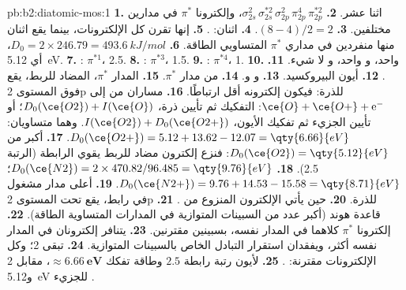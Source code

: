 \begin{solution}{pb:b2:diatomic-mos:1}
\textbf{1.} اثنا عشر.
\textbf{2.} $\sigma_{2s}^2\,\sigma_{2s}^{*2}\,\sigma_{2p}^2\,\pi_{2p}^4\,\pi_{2p}^{*2}$، وإلكترونا $\pi^*$
في مدارين مختلفين.
\textbf{3.} $(8 - 4)/2 = 2$.
\textbf{4.} اثنان:  .
\textbf{5.} إنها تقرن كل الإلكترونات، بينما يقع اثنان منها منفردين في مداري
$\pi^*$ المتساويي الطاقة.
\textbf{6.} $D_0 = 2 \times 246.79 = \qty{493.6}{kJ/mol}$، أي \qty{5.12}{eV}.
\textbf{7.} : $\pi^{*1}$،  2.5.
\textbf{8.} : $\pi^{*3}$،  1.5.
\textbf{9.} : $\pi^{*4}$،  1.
\textbf{10.}  واحد، و واحد، و لا شيء.
\textbf{11.} .
\textbf{12.} أيون البيروكسيد.
\textbf{13.}  و و.
\textbf{14.} من مدار $\pi^*$.
\textbf{15.} المدار $\pi^*$، المضاد للربط، يقع فوق المستوى 2p للذرة: فيكون
إلكترونه أقل ارتباطًا.
\textbf{16.} مساران من  إلى $\ce{O} + \ce{O+} + \mathrm e^-$: التفكيك ثم
تأيين ذرة، $D_0(\ce{O2}) + I(\ce{O})$؛ أو تأيين الجزيء ثم تفكيك الأيون،
$I(\ce{O2}) + D_0(\ce{O2+})$. وهما متساويان: $D_0(\ce{O2+}) = 5.12 + 13.62 - 12.07 = \qty{6.66}{eV}$.
\textbf{17.} أكبر من $D_0(\ce{O2}) = \qty{5.12}{eV}$: فنزع إلكترون مضاد للربط
يقوي الرابطة (الرتبة 2.5).
\textbf{18.} $D_0(\ce{N2}) = 2 \times 470.82/96.485 = \qty{9.76}{eV}$؛ $D_0(\ce{N2+}) = 9.76 +
14.53 - 15.58 = \qty{8.71}{eV}$.
\textbf{19.} أعلى مدار مشغول في  رابط، يقع تحت المستوى 2p
للذرة.
\textbf{20.} حين يأتي الإلكترون المنزوع من .
\textbf{21.} قاعدة هوند (أكبر عدد من السبينات المتوازية في المدارات المتساوية الطاقة).
\textbf{22.} إلكترونا $\pi^*$ كلاهما في المدار نفسه، بسبينين مقترنين.
\textbf{23.} يتنافر إلكترونان في المدار نفسه أكثر، ويفقدان
استقرار التبادل الخاص بالسبينات المتوازية.
\textbf{24.} تبقى  2؛ وكل الإلكترونات مقترنة: .
\textbf{25.} لأيون  رتبة رابطة $\boldsymbol{2.5}$ وطاقة تفكك
$\boldsymbol{\approx \qty{6.66}{eV}}$، مقابل 2 و\qty{5.12}{eV} للجزيء .
\end{solution}
